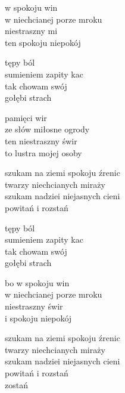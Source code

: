 \begin{text}
    w spokoju win\\
    w niechcianej porze mroku\\
    niestraszny mi\\
    ten spokoju niepokój

    tępy ból\\
    sumieniem zapity kac\\
    tak chowam swój\\
    gołębi strach

    pamięci wir\\
    ze słów miłosne ogrody\\
    ten niestraszny świr\\
    to lustra mojej osoby

    szukam na ziemi spokoju źrenic\\
    twarzy niechcianych miraży\\
    szukam nadziei niejasnych cieni\\
    powitań i rozstań

    tępy ból\\
    sumieniem zapity kac\\
    tak chowam swój\\
    gołębi strach

    bo w spokoju win\\
    w niechcianej porze mroku\\
    niestraszny świr\\
    i spokoju niepokój

    szukam na ziemi spokoju źrenic\\
    twarzy niechcianych miraży\\
    szukam nadziei niejasnych cieni\\
    powitań i rozstań\\
    zostań
\end{text}
\begin{chord}

\end{chord}